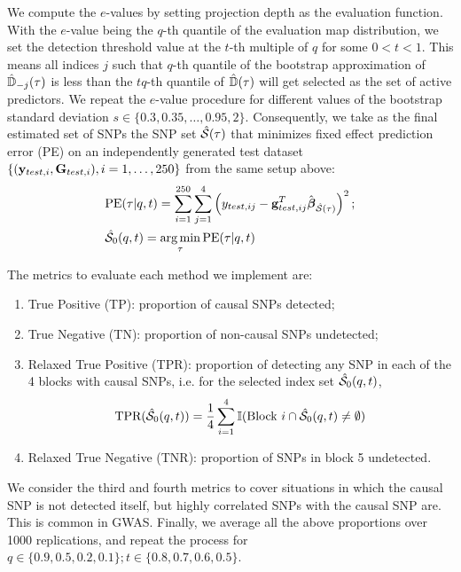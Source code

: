 \vspace{1em}\noindent We compute the $e$-values by setting projection depth \citep{zuo03} as the evaluation function. With the $e$-value being the $q$-th quantile of the evaluation map distribution, we set the detection threshold value at the $t$-th multiple of $q$ for some $0 < t < 1$. This means all indices $j$ such that $q$-th quantile of the bootstrap approximation of $\hat {{\mathbb{D}}}_{-j} (\tau)$ is less than the $tq$-th quantile of $\hat {{\mathbb{D}}} (\tau)$ will get selected as the set of active predictors. We repeat the $e$-value procedure for different values of the bootstrap standard deviation $s \in \{ 0.3, 0.35, \ldots, 0.95, 2 \}$. Consequently, we take as the final estimated set of SNPs the SNP set $\hat {{\cal{S}}} (\tau)$ that minimizes fixed effect prediction error (PE) on an independently generated test dataset $\{ ({\bf{y}}_{test,i}, {\mathbf{G}}_{test,i}), i = 1, \ldots, 250 \}$ from the same setup above:
%
\begin{align*}
& \text{PE} (\tau | q,t)  = \sum_{i=1}^{250} \sum_{j=1}^4 \left( y_{test,ij} - {\bf{g}}_{test,ij}^T \hat {{\boldsymbol{\beta}}}_{\hat {{\cal{S}}} (\tau)} \right)^2; \\
& \hat {{\cal{S}}}_0 (q,t) = \operatorname*{arg\,min}_\tau \text{PE} (\tau | q,t)
\end{align*}

The metrics to evaluate each method we implement are:

\begin{enumerate}
\item True Positive (TP): proportion of causal SNPs detected;

\item True Negative (TN): proportion of non-causal SNPs undetected;

\item Relaxed True Positive (TPR): proportion of detecting any SNP in each of the 4 blocks with causal SNPs, i.e. for the selected index set $\hat {{\cal{S}}}_0 (q,t)$,
%
$$
\text{TPR} ( \hat {{\cal{S}}}_0 (q,t) ) = \frac{1}{4} \sum_{i=1}^4 {\mathbb{I}} ( \text{Block } i \cap \hat {{\cal{S}}}_0 (q,t) \neq \emptyset )
$$
%

\item Relaxed True Negative (TNR): proportion of SNPs in block 5 undetected.
\end{enumerate}

\noindent We consider the third and fourth metrics to cover situations in which the causal SNP is not detected itself, but highly correlated SNPs with the causal SNP are. This is common in GWAS. Finally, we average all the above proportions over 1000 replications, and repeat the process for $ q \in \{ 0.9, 0.5, 0.2, 0.1 \}; t \in \{ 0.8, 0.7, 0.6, 0.5 \}$.

